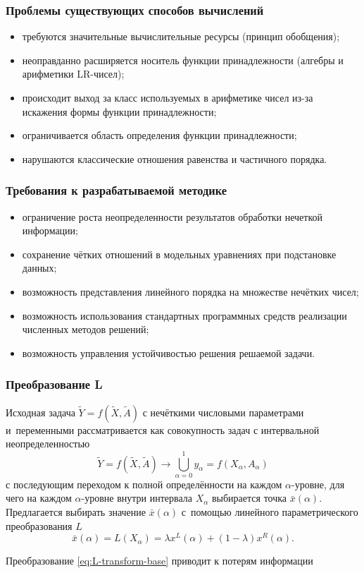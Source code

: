 \documentclass[12pt]{beamer}
\begin{document}
\begin{frame}
  \frametitle{Проблемы существующих способов вычислений}
  \begin{itemize}
    \item требуются значительные вычислительные ресурсы (принцип обобщения);
    \item неоправданно расширяется носитель функции принадлежности (алгебры и арифметики LR-чисел);
    \item происходит выход за класс используемых в арифметике чисел из-за искажения формы функции принадлежности;
    \item ограничивается область определения функции принадлежности;
    \item нарушаются классические отношения равенства и частичного порядка.
  \end{itemize}
\end{frame}

\begin{frame}
  \frametitle{Требования к разрабатываемой методике}
  \begin{itemize}
	\item ограничение роста неопределенности результатов обработки нечеткой информации;
	\item сохранение чётких отношений в модельных уравнениях при подстановке данных;
	\item возможность представления линейного порядка на множестве нечётких чисел;
	\item возможность использования стандартных программных средств реализации численных методов решений;
	\item возможность управления устойчивостью решения решаемой задачи.
  \end{itemize}
\end{frame}

\begin{frame}
  \frametitle{Преобразование L}
  Исходная задача $\tilde{Y}=f\left( \tilde{X}, \tilde A \right)$ с нечёткими числовыми параметрами и~переменными рассматривается как совокупность задач с интервальной неопределенностью
  \begin{equation}
    \label{eq:task-transform}
  	\tilde{Y} = f\left( \tilde X, \tilde A \right)\to \bigcup\limits_{\alpha =0}^{1}{y_\alpha}=f\left( X_\alpha, A_\alpha \right)
  \end{equation}
  с последующим переходом к полной определённости на каждом $\alpha$-уровне, для чего на каждом $\alpha$-уровне внутри интервала $X_\alpha$ выбирается точка $\bar{x}\left( \alpha  \right)$. Предлагается выбирать значение $\bar{x}\left( \alpha  \right)$ с~помощью линейного параметрического преобразования $L$
  \begin{equation}
    \label{eq:L-transform-base}
    \bar{x}\left( \alpha  \right)=L\left( X_\alpha \right)=\lambda x^L \left( \alpha  \right)+\left( 1-\lambda  \right) x^R \left( \alpha  \right).
  \end{equation}
  
  Преобразование \eqref{eq:L-transform-base} приводит к потерям информации
\end{frame}
\end{document}
